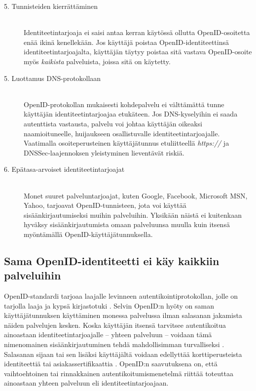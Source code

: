 \documentclass{tktltiki}
\begin{document}
\begin{description}
  \item[5. Tunnisteiden kierrättäminen] \hfill \\
    Identiteetintarjoaja ei saisi antaa kerran käytössä ollutta OpenID-osoitetta enää ikinä kenellekään.
    Jos käyttäjä poistaa OpenID-identiteettinsä identiteetintarjoajalta, käyttäjän täytyy poistaa sitä vastava 
    OpenID-osoite
    myös \emph{kaikista} palveluista, joissa sitä on käytetty.
   
  \item[5. Luottamus DNS-protokollaan] \hfill \\
    OpenID-protokollan mukaisesti kohdepalvelu ei välttämättä tunne käyttäjän identiteetintarjoajaa etukäteen.    
    Jos DNS-kyselyihin ei saada autenttista vastausta, palvelu voi johtaa käyttäjän oikeaksi naamioituneelle,
    huijaukseen osallistuvalle identiteetintarjoajalle. Vaatimalla osoiteperusteinen käyttäjätunnus
    etuliitteellä \emph{https://} ja DNSSec-laajennoksen yleistyminen lieventävät riskiä.

   \item[6. Epätasa-arvoiset identiteetintarjoajat] \hfill \\
      Monet suuret palveluntarjoajat, kuten Google, Facebook, Microsoft MSN, Yahoo, tarjoavat OpenID-tunnisteen,
      jota voi käyttää sisäänkirjautumiseksi muihin palveluihin. Yksikään näistä ei kuitenkaan hyväksy
      sisäänkirjautumista omaan palveluunsa muulla kuin itsensä myöntämällä OpenID-käyttäjätunnuksella.
      
\end{description}

   
\subsection{Sama OpenID-identiteetti ei käy kaikkiin palveluihin}

OpenID-standardi tarjoaa laajalle levinneen autentikointiprotokollan, jolle on tarjolla laaja ja kypsä kirjastotuki \cite{openid_libraries}. Selvin OpenID:n hyöty on saman käyttäjätunnuksen käyttäminen monessa palvelussa ilman salasanan jakamista näiden palvelujen kesken. Koska käyttäjän itsensä tarvitsee autentikoitua ainoastaan identiteetintarjoajalle -- yhteen palveluun -- voidaan tämä nimenomainen sisäänkirjautuminen tehdä mahdollisimman turvalliseksi \cite{blackhat_openid_security_story}. Salasanan sijaan tai sen lisäksi käyttäjältä voidaan edellyttää korttiperusteista identiteettiä \cite{cameron_infocard_07} tai asiakassertifikaattia \cite{henry_story_foaf_ssl}. OpenID:n saavutuksena on, että vaihtoehtoinen tai rinnakkainen autentikoitumismenetelmä riittää toteuttaa ainoastaan yhteen palveluun eli identiteetintarjoajaan.
\end{document}
